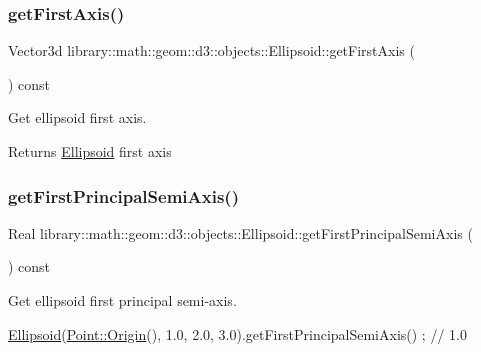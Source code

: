 \subsubsection{\texorpdfstring{get\+First\+Axis()}{getFirstAxis()}}
{\footnotesize\ttfamily Vector3d library\+::math\+::geom\+::d3\+::objects\+::\+Ellipsoid\+::get\+First\+Axis (\begin{DoxyParamCaption}{ }\end{DoxyParamCaption}) const}



Get ellipsoid first axis. 

\begin{DoxyReturn}{Returns}
\hyperlink{classlibrary_1_1math_1_1geom_1_1d3_1_1objects_1_1_ellipsoid}{Ellipsoid} first axis 
\end{DoxyReturn}
\mbox{\label{classlibrary_1_1math_1_1geom_1_1d3_1_1objects_1_1_ellipsoid_a8219b05b4c6afcd71e915d10b6129baf}} 
\subsubsection{\texorpdfstring{get\+First\+Principal\+Semi\+Axis()}{getFirstPrincipalSemiAxis()}}
{\footnotesize\ttfamily Real library\+::math\+::geom\+::d3\+::objects\+::\+Ellipsoid\+::get\+First\+Principal\+Semi\+Axis (\begin{DoxyParamCaption}{ }\end{DoxyParamCaption}) const}



Get ellipsoid first principal semi-\/axis. 


\begin{DoxyCode}
\hyperlink{classlibrary_1_1math_1_1geom_1_1d3_1_1objects_1_1_ellipsoid_aae81fe0edc7f0e8d4590ea89ae73cb14}{Ellipsoid}(\hyperlink{classlibrary_1_1math_1_1geom_1_1d3_1_1objects_1_1_point_ab2a38e285c562e50bf350272c083986f}{Point::Origin}(), 1.0, 2.0, 3.0).getFirstPrincipalSemiAxis() ; \textcolor{comment}{// 1.0}
\end{DoxyCode}


